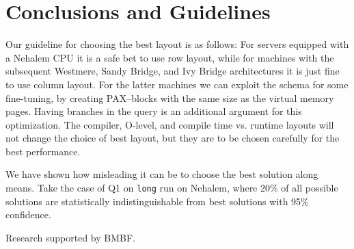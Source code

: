 \documentclass{sig-alternate}
\begin{document}
\section{Conclusions and Guidelines}

Our guideline for choosing the best layout is as follows:
For servers equipped with a Nehalem CPU it is a safe bet to use row layout, while for machines with the subsequent Westmere, Sandy Bridge, and Ivy Bridge architectures it is just fine to use column layout. For the latter machines we can exploit the schema for some fine-tuning, by creating PAX--blocks with the same size as the virtual memory pages. Having branches in the query is an additional argument for this optimization. The compiler, O-level, and compile time vs. runtime layouts will not change the choice of best layout, but they are to be chosen carefully for the best performance.

We have shown how misleading it can be to choose the best solution along means. Take the case of Q1 on \texttt{long} run on Nehalem, where 20\% of all possible solutions are statistically indistinguishable from best solutions with 95\% confidence.

 Research supported by BMBF.

\balance

\vspace{-5pt}

\scriptsize


\end{document}
